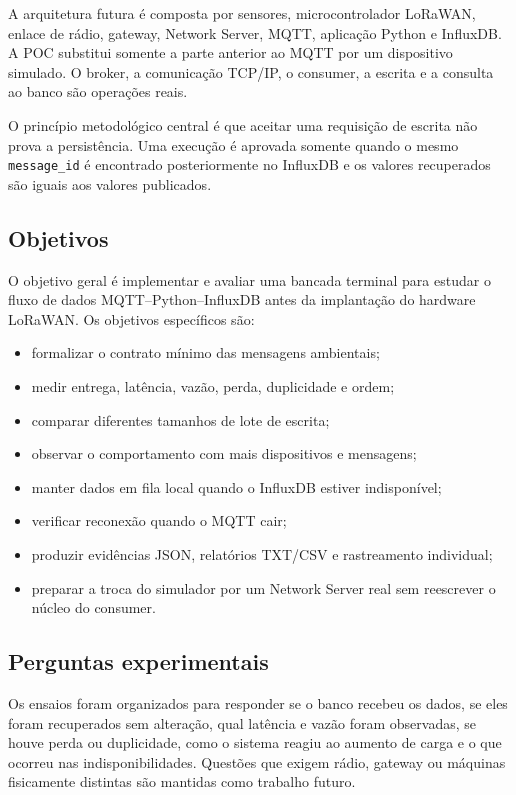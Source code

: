 \documentclass[12pt,a4paper]{article}
\newcommand{\code}[1]{\texttt{#1}}
\begin{document}
A arquitetura futura é composta por sensores, microcontrolador LoRaWAN, enlace de rádio, gateway, Network Server, MQTT, aplicação Python e InfluxDB. A POC substitui somente a parte anterior ao MQTT por um dispositivo simulado. O broker, a comunicação TCP/IP, o consumer, a escrita e a consulta ao banco são operações reais.

O princípio metodológico central é que aceitar uma requisição de escrita não prova a persistência. Uma execução é aprovada somente quando o mesmo \code{message\_id} é encontrado posteriormente no InfluxDB e os valores recuperados são iguais aos valores publicados.

\subsection{Objetivos}

O objetivo geral é implementar e avaliar uma bancada terminal para estudar o fluxo de dados MQTT--Python--InfluxDB antes da implantação do hardware LoRaWAN. Os objetivos específicos são:

\begin{itemize}
  \item formalizar o contrato mínimo das mensagens ambientais;
  \item medir entrega, latência, vazão, perda, duplicidade e ordem;
  \item comparar diferentes tamanhos de lote de escrita;
  \item observar o comportamento com mais dispositivos e mensagens;
  \item manter dados em fila local quando o InfluxDB estiver indisponível;
  \item verificar reconexão quando o MQTT cair;
  \item produzir evidências JSON, relatórios TXT/CSV e rastreamento individual;
  \item preparar a troca do simulador por um Network Server real sem reescrever o núcleo do consumer.
\end{itemize}

\subsection{Perguntas experimentais}

Os ensaios foram organizados para responder se o banco recebeu os dados, se eles foram recuperados sem alteração, qual latência e vazão foram observadas, se houve perda ou duplicidade, como o sistema reagiu ao aumento de carga e o que ocorreu nas indisponibilidades. Questões que exigem rádio, gateway ou máquinas fisicamente distintas são mantidas como trabalho futuro.
\end{document}
